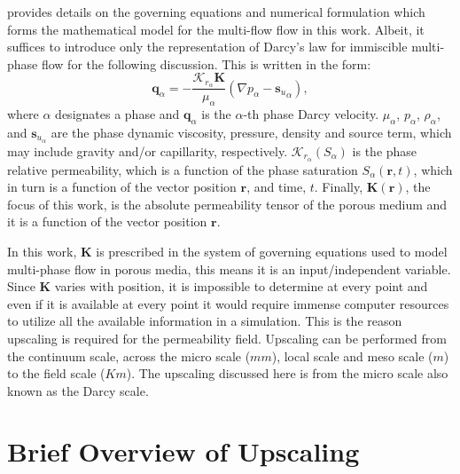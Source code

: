 \documentclass[preprint,12pt]{elsarticle}
\begin{document}
\citet{Gomes_2017} provides details on the governing equations and numerical formulation which forms the mathematical model for the multi-flow flow in this work. Albeit, it suffices to introduce only the representation of Darcy's law for immiscible multi-phase flow for the following discussion. This is written in the form:
\begin{equation}\label{e:darcy_eqn}
  \mathbf{q}_{\alpha} =
  -\frac{\mathcal{K}_{{r}_\alpha}\mathbf{K}}{\mu_{\alpha}}\left(
  \nabla p_{\alpha} - {\mathbf{s}_{u}}_{\alpha} \right),
\end{equation}
where $\alpha$ designates a phase and $\mathbf{q}_{\alpha}$ is the $\alpha$-th phase Darcy velocity. $\mu_{\alpha}$, $p_{\alpha}$, $\rho_{\alpha}$, and $\mathbf{s}_{{u}_\alpha}$ are the phase dynamic viscosity, pressure, density and source term, which may include gravity and/or capillarity, respectively. $\mathcal{K}_{{r}_\alpha}\left(S_{\alpha}\right)$ is the phase relative permeability, which is a function of the phase saturation $S_{\alpha}\left(\mathbf{r},t\right)$, which in turn is a function of the vector position $\mathbf{r}$, and time, $t$. Finally, $\mathbf{K}\left(\mathbf{r}\right)$, the focus of this work, is the absolute permeability tensor of the porous medium and it is a function of the vector position $\mathbf{r}$.

In this work, $\mathbf{K}$ is prescribed in the system of governing equations used to model multi-phase flow in porous media, this means it is an input/independent variable. Since $\mathbf{K}$ varies with position, it is impossible to determine at every point and even if it is available at every point it would require immense computer resources to utilize all the available information in a simulation. This is the reason upscaling is required for the permeability field. Upscaling can be performed from the continuum scale, across the micro scale ($mm$), local scale and meso scale ($m$) to the field scale ($Km$)\cite{ECMI_2004}. The upscaling discussed here is from the micro scale also known as the Darcy scale.

\section{Brief Overview of Upscaling}\label{section:overview_upscaling}
\end{document}
